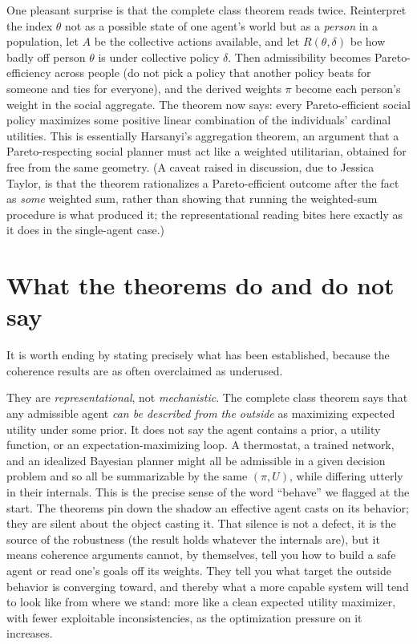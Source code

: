\documentclass[10pt]{article}
\theoremstyle{definition}
\theoremstyle{remark}
\begin{document}
One pleasant surprise is that the complete class theorem reads twice. Reinterpret the index $\theta$ not as a possible state of one agent's world but as a \emph{person} in a population, let $A$ be the collective actions available, and let $R(\theta, \delta)$ be how badly off person $\theta$ is under collective policy $\delta$. Then admissibility becomes Pareto-efficiency across people (do not pick a policy that another policy beats for someone and ties for everyone), and the derived weights $\pi$ become each person's weight in the social aggregate. The theorem now says: every Pareto-efficient social policy maximizes some positive linear combination of the individuals' cardinal utilities. This is essentially Harsanyi's aggregation theorem, an argument that a Pareto-respecting social planner must act like a weighted utilitarian, obtained for free from the same geometry. (A caveat raised in discussion, due to Jessica Taylor, is that the theorem rationalizes a Pareto-efficient outcome after the fact as \emph{some} weighted sum, rather than showing that running the weighted-sum procedure is what produced it; the representational reading bites here exactly as it does in the single-agent case.)

\section{What the theorems do and do not say}
\label{sec:scope}

It is worth ending by stating precisely what has been established, because the coherence results are as often overclaimed as underused.

They are \emph{representational}, not \emph{mechanistic}. The complete class theorem says that any admissible agent \emph{can be described from the outside} as maximizing expected utility under some prior. It does not say the agent contains a prior, a utility function, or an expectation-maximizing loop. A thermostat, a trained network, and an idealized Bayesian planner might all be admissible in a given decision problem and so all be summarizable by the same $(\pi, U)$, while differing utterly in their internals. This is the precise sense of the word ``behave'' we flagged at the start. The theorems pin down the shadow an effective agent casts on its behavior; they are silent about the object casting it. That silence is not a defect, it is the source of the robustness (the result holds whatever the internals are), but it means coherence arguments cannot, by themselves, tell you how to build a safe agent or read one's goals off its weights. They tell you what target the outside behavior is converging toward, and thereby what a more capable system will tend to look like from where we stand: more like a clean expected utility maximizer, with fewer exploitable inconsistencies, as the optimization pressure on it increases.
\end{document}
